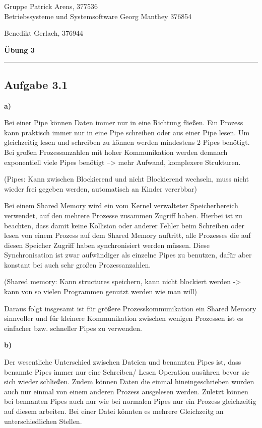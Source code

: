 \documentclass[a4paper,graphics,11pt]{article}
\newcommand{\aufgabe}[1]{\subsection*{Aufgabe #1}}
\begin{document}
\noindent Gruppe              \hfill Patrick Arens, 377536\\
\noindent Betriebssysteme und Systemsoftware    \hfill Georg Manthey 376854\\
\strut\hfill Benedikt Gerlach, 376944\\
\begin{center}
	\LARGE{\textbf{Übung 3}}
\end{center}
\begin{center}
\rule[0.1ex]{\textwidth}{1pt}
\end{center}

\aufgabe{3.1}

\textbf{a)}

Bei einer Pipe können Daten immer nur in eine Richtung fließen. Ein Prozess kann praktisch immer nur in eine Pipe schreiben oder aus einer Pipe lesen. 
Um gleichzeitig lesen und schreiben zu können werden mindestens 2 Pipes benötigt.
Bei großen Prozessanzahlen mit hoher Kommunikation werden demnach exponentiell viele Pipes benötigt --> mehr Aufwand, komplexere Strukturen.

(Pipes: Kann zwischen Blockierend und nicht Blockierend wechseln, muss nicht wieder frei gegeben werden, automatisch an Kinder vererbbar)


Bei einem Shared Memory wird ein vom Kernel verwalteter Speicherbereich verwendet, auf den mehrere Prozesse zusammen Zugriff haben. Hierbei ist zu beachten, dass damit keine Kollision oder anderer Fehler beim Schreiben oder lesen von einem Prozess auf dem Shared Memory auftritt, alle Prozesses die auf diesen Speicher Zugriff haben synchronisiert werden müssen. 
Diese Synchronisation ist zwar aufwändiger als einzelne Pipes zu benutzen, dafür aber konstant bei auch sehr großen Prozessanzahlen.

(Shared memory: Kann structures speichern, kann nicht blockiert werden -> kann von so vielen Programmen genutzt werden wie man will)

Daraus folgt insgesamt ist für größere Prozesskommunikation ein Shared Memory sinnvoller und für kleinere Kommunikation zwischen wenigen Prozessen ist es einfacher bzw. schneller Pipes zu verwenden.




\textbf{b)}

Der wesentliche Unterschied zwischen Dateien und benannten Pipes ist, dass benannte Pipes immer nur eine Schreiben/ Lesen Operation ausühren bevor sie sich wieder schließen. Zudem können Daten die einmal hineingeschrieben wurden auch nur einmal von einem anderen Prozess ausgelesen werden. Zuletzt können bei bennanten Pipes auch nur wie bei normalen Pipes nur ein Prozess gleichzeitig auf diesem arbeiten. Bei einer Datei könnten es mehrere Gleichzeitg an unterschiedlichen Stellen.
\end{document}
